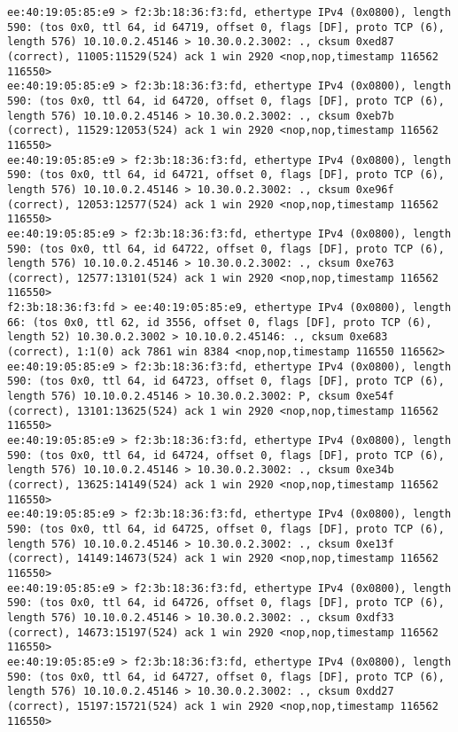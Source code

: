 \documentclass[a4paper,12pt]{article}
\begin{document}
\begin{Verbatim}
ee:40:19:05:85:e9 > f2:3b:18:36:f3:fd, ethertype IPv4 (0x0800), length 590: (tos 0x0, ttl 64, id 64719, offset 0, flags [DF], proto TCP (6), length 576) 10.10.0.2.45146 > 10.30.0.2.3002: ., cksum 0xed87 (correct), 11005:11529(524) ack 1 win 2920 <nop,nop,timestamp 116562 116550>
ee:40:19:05:85:e9 > f2:3b:18:36:f3:fd, ethertype IPv4 (0x0800), length 590: (tos 0x0, ttl 64, id 64720, offset 0, flags [DF], proto TCP (6), length 576) 10.10.0.2.45146 > 10.30.0.2.3002: ., cksum 0xeb7b (correct), 11529:12053(524) ack 1 win 2920 <nop,nop,timestamp 116562 116550>
ee:40:19:05:85:e9 > f2:3b:18:36:f3:fd, ethertype IPv4 (0x0800), length 590: (tos 0x0, ttl 64, id 64721, offset 0, flags [DF], proto TCP (6), length 576) 10.10.0.2.45146 > 10.30.0.2.3002: ., cksum 0xe96f (correct), 12053:12577(524) ack 1 win 2920 <nop,nop,timestamp 116562 116550>
ee:40:19:05:85:e9 > f2:3b:18:36:f3:fd, ethertype IPv4 (0x0800), length 590: (tos 0x0, ttl 64, id 64722, offset 0, flags [DF], proto TCP (6), length 576) 10.10.0.2.45146 > 10.30.0.2.3002: ., cksum 0xe763 (correct), 12577:13101(524) ack 1 win 2920 <nop,nop,timestamp 116562 116550>
f2:3b:18:36:f3:fd > ee:40:19:05:85:e9, ethertype IPv4 (0x0800), length 66: (tos 0x0, ttl 62, id 3556, offset 0, flags [DF], proto TCP (6), length 52) 10.30.0.2.3002 > 10.10.0.2.45146: ., cksum 0xe683 (correct), 1:1(0) ack 7861 win 8384 <nop,nop,timestamp 116550 116562>
ee:40:19:05:85:e9 > f2:3b:18:36:f3:fd, ethertype IPv4 (0x0800), length 590: (tos 0x0, ttl 64, id 64723, offset 0, flags [DF], proto TCP (6), length 576) 10.10.0.2.45146 > 10.30.0.2.3002: P, cksum 0xe54f (correct), 13101:13625(524) ack 1 win 2920 <nop,nop,timestamp 116562 116550>
ee:40:19:05:85:e9 > f2:3b:18:36:f3:fd, ethertype IPv4 (0x0800), length 590: (tos 0x0, ttl 64, id 64724, offset 0, flags [DF], proto TCP (6), length 576) 10.10.0.2.45146 > 10.30.0.2.3002: ., cksum 0xe34b (correct), 13625:14149(524) ack 1 win 2920 <nop,nop,timestamp 116562 116550>
ee:40:19:05:85:e9 > f2:3b:18:36:f3:fd, ethertype IPv4 (0x0800), length 590: (tos 0x0, ttl 64, id 64725, offset 0, flags [DF], proto TCP (6), length 576) 10.10.0.2.45146 > 10.30.0.2.3002: ., cksum 0xe13f (correct), 14149:14673(524) ack 1 win 2920 <nop,nop,timestamp 116562 116550>
ee:40:19:05:85:e9 > f2:3b:18:36:f3:fd, ethertype IPv4 (0x0800), length 590: (tos 0x0, ttl 64, id 64726, offset 0, flags [DF], proto TCP (6), length 576) 10.10.0.2.45146 > 10.30.0.2.3002: ., cksum 0xdf33 (correct), 14673:15197(524) ack 1 win 2920 <nop,nop,timestamp 116562 116550>
ee:40:19:05:85:e9 > f2:3b:18:36:f3:fd, ethertype IPv4 (0x0800), length 590: (tos 0x0, ttl 64, id 64727, offset 0, flags [DF], proto TCP (6), length 576) 10.10.0.2.45146 > 10.30.0.2.3002: ., cksum 0xdd27 (correct), 15197:15721(524) ack 1 win 2920 <nop,nop,timestamp 116562 116550>

\end{Verbatim}
\end{document}
